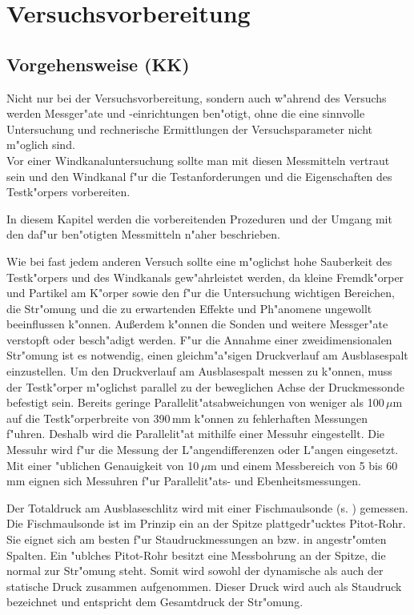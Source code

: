 \section{Versuchsvorbereitung}
\label{sec:Versuchsvorbereitung}
\subsection{Vorgehensweise (KK)}
Nicht nur bei der Versuchsvorbereitung, sondern auch w"ahrend des Versuchs werden Messger"ate und -einrichtungen ben"otigt, ohne die eine sinnvolle Untersuchung und rechnerische Ermittlungen der Versuchsparameter nicht m"oglich sind.\\
Vor einer Windkanaluntersuchung sollte man mit diesen Messmitteln vertraut sein und den Windkanal f"ur die Testanforderungen und die Eigenschaften des Testk"orpers vorbereiten.

In diesem Kapitel werden die vorbereitenden Prozeduren und der Umgang mit den daf"ur ben"otigten Messmitteln n"aher beschrieben.

Wie bei fast jedem anderen Versuch sollte eine m"oglichst hohe Sauberkeit des Testk"orpers und des Windkanals gew"ahrleistet werden, da kleine Fremdk"orper und Partikel am K"orper sowie den f"ur die Untersuchung wichtigen Bereichen, die Str"omung und die zu erwartenden Effekte und Ph"anomene ungewollt beeinflussen k"onnen. Au\ss{}erdem k"onnen die Sonden und weitere Messger"ate verstopft oder besch"adigt werden.
F"ur die Annahme einer zweidimensionalen Str"omung ist es notwendig, einen gleichm"a"sigen Druckverlauf am Ausblasespalt einzustellen.
Um den Druckverlauf am Ausblasespalt messen zu k"onnen, muss der Testk"orper m"oglichst parallel zu der beweglichen Achse der Druckmessonde befestigt sein. Bereits geringe Parallelit"atsabweichungen von weniger als 100\,$\mu$m auf die Testk"orperbreite von 390\,mm k"onnen zu fehlerhaften Messungen f"uhren. Deshalb wird die Parallelit"at mithilfe einer Messuhr eingestellt. Die Messuhr wird f"ur die Messung der L"angendifferenzen oder L"angen eingesetzt. Mit einer "ublichen Genauigkeit von 10\,$\mu$m und einem Messbereich von 5 bis 60\,mm eignen sich Messuhren f"ur Parallelit"ats- und Ebenheitsmessungen.

Der Totaldruck am Ausblaseschlitz wird mit einer Fischmaulsonde (s. ) gemessen. Die Fischmaulsonde ist im Prinzip ein an der Spitze plattgedr"ucktes Pitot-Rohr. Sie eignet sich am besten f"ur Staudruckmessungen an bzw. in angestr"omten Spalten. Ein "ublches Pitot-Rohr besitzt eine Messbohrung an der Spitze, die normal zur Str"omung steht. Somit wird sowohl der dynamische als auch der statische Druck zusammen aufgenommen. Dieser Druck wird auch als Staudruck bezeichnet und entspricht dem Gesamtdruck der Str"omung.

